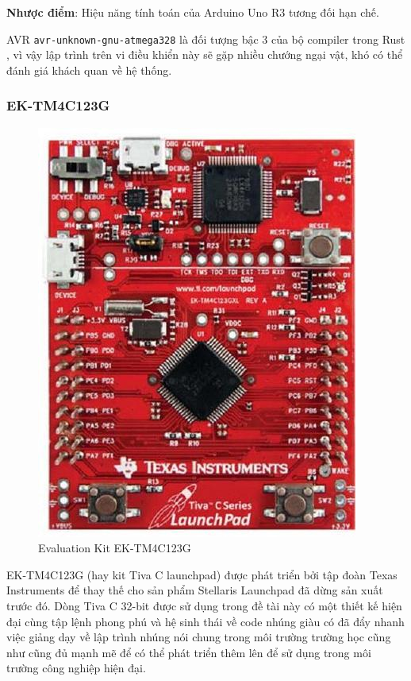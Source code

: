 \textbf{Nhược điểm}: Hiệu năng tính toán của Arduino Uno R3 tương đối hạn chế.

AVR \texttt{avr-unknown-gnu-atmega328} là đối tượng bậc 3 của bộ compiler trong Rust \cite{rustc_book}, vì vậy lập trình trên vi điều khiển này sẽ gặp nhiều chướng ngại vật, khó có thể đánh giá khách quan về hệ thống.

\clearpage
\subsubsection{EK-TM4C123G}
\begin{figure}[ht]
\centering
\includegraphics[scale=0.5]{images/kit_tivac.jpg}
\caption{Evaluation Kit EK-TM4C123G}
\end{figure}

EK-TM4C123G \cite{tivac_datasheet} (hay kit Tiva C launchpad) được phát triển bởi tập đoàn Texas Instruments để thay thế cho sản phẩm Stellaris Launchpad đã dừng sản xuất trước đó.
Dòng Tiva C 32-bit được sử dụng trong đề tài này có một thiết kế hiện đại cùng tập lệnh phong phú và hệ sinh thái về code nhúng giàu có
đã đẩy nhanh việc giảng dạy về lập trình nhúng nói chung trong môi trường trường học cũng như cũng đủ mạnh mẽ để có thể phát triển thêm lên để sử dụng trong môi trường công nghiệp hiện đại.

